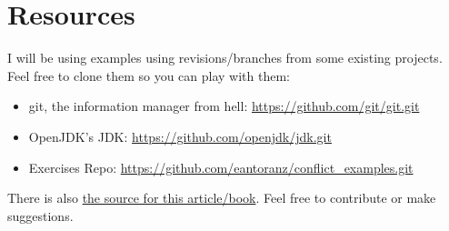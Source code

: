 
\section{Resources}

I will be using examples using revisions/branches from some existing projects. Feel free to clone them so you can play with them:

\begin{itemize}

	\item git, the information manager from hell: \url{https://github.com/git/git.git}
	\label{git_repo}

	\item OpenJDK's JDK: \url{https://github.com/openjdk/jdk.git}
	\label{openjdk_repo}
	
	\item Exercises Repo: \url{https://github.com/eantoranz/conflict_examples.git}
	\label{exercises_repo}

\end{itemize}

There is also \href{https://github.com/eantoranz/conflict_book.git}{the source for this article/book}.
Feel free to contribute or make suggestions.
